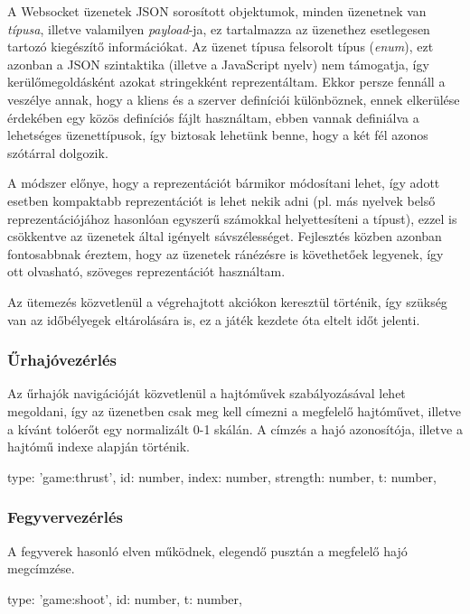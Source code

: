 A Websocket üzenetek JSON sorosított objektumok, minden üzenetnek van
\emph{típusa}, illetve valamilyen \emph{payload}-ja, ez tartalmazza az üzenethez
esetlegesen tartozó kiegészítő információkat. Az üzenet típusa felsorolt típus
(\emph{enum}), ezt azonban a JSON szintaktika (illetve a JavaScript nyelv) nem
támogatja, így kerülőmegoldásként azokat stringekként reprezentáltam. Ekkor
persze fennáll a veszélye annak, hogy a kliens és a szerver definíciói
különböznek, ennek elkerülése érdekében egy közös definíciós fájlt használtam,
ebben vannak definiálva a lehetséges üzenettípusok, így biztosak lehetünk benne,
hogy a két fél azonos szótárral dolgozik.

A módszer előnye, hogy a reprezentációt bármikor módosítani lehet, így adott
esetben kompaktabb reprezentációt is lehet nekik adni (pl. más nyelvek belső
reprezentációjához hasonlóan egyszerű számokkal helyettesíteni a típust), ezzel
is csökkentve az üzenetek által igényelt sávszélességet. Fejlesztés közben
azonban fontosabbnak éreztem, hogy az üzenetek ránézésre is követhetőek
legyenek, így ott olvasható, szöveges reprezentációt használtam.

Az ütemezés közvetlenül a végrehajtott akciókon keresztül történik, így szükség
van az időbélyegek eltárolására is, ez a játék kezdete óta eltelt időt jelenti.

\subsubsection{Űrhajóvezérlés}

Az űrhajók navigációját közvetlenül a hajtóművek szabályozásával lehet
megoldani, így az üzenetben csak meg kell címezni a megfelelő hajtóművet,
illetve a kívánt tolóerőt egy normalizált 0-1 skálán. A címzés a hajó
azonosítója, illetve a hajtómű indexe alapján történik.

\begin{js}
  {
    type: 'game:thrust',
    id: number,
    index: number,
    strength: number,
    t: number,
  }
\end{js}

\subsubsection{Fegyvervezérlés}

A fegyverek hasonló elven működnek, elegendő pusztán a megfelelő hajó megcímzése.

\begin{js}
  {
    type: 'game:shoot',
    id: number,
    t: number,
  }
\end{js}

